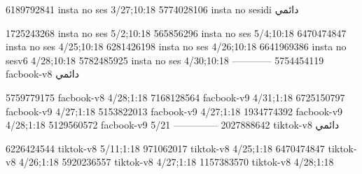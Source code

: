 
6189792841 insta no ses
3/27;10:18
5774028106 insta no sesidi
دائمي


1725243268 insta no ses
5/2;10:18
565856296 insta no ses
5/4;10:18
6470474847 insta no ses
4/25;10:18
6281426198 insta no ses
4/26;10:18
6641969386 insta no sesv6
4/28;10:18
5782485925 insta no ses
4/30;10:18
------------
5754454119 facbook-v8
دائمي

5759779175 facbook-v8
4/28;1:18
7168128564 facbook-v9
4/31;1:18
6725150797 facbook-v9
4/27;1:18
5153822013 facbook-v9
4/27;1:18
1934774392 facbook-v9
4/28;1:18
5129560572 facbook-v9
5/21
--------------
2027888642 tiktok-v8
دائمي

6226424544 tiktok-v8
5/11;1:18
971062017 tiktok-v8
4/25;1:18
6470474847 tiktok-v8
4/26;1:18
5920236557 tiktok-v8
4/27;1:18
1157383570 tiktok-v8
4/28;1:18
